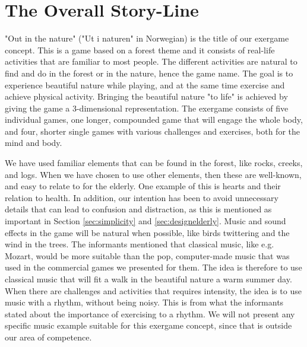\section{The Overall Story-Line}
\label{sec:outinthenature}

"Out in the nature" ("Ut i naturen" in Norwegian) is the title of our exergame concept. This is a game based on a forest theme and it consists of real-life activities that are familiar to most people. The different activities are natural to find and do in the forest or in the nature, hence the game name. The goal is to experience beautiful nature while playing, and at the same time exercise and achieve physical activity. Bringing the beautiful nature "to life" is achieved by giving the game a 3-dimensional representation. The exergame consists of five individual games, one longer, compounded game that will engage the whole body, and four, shorter single games with various challenges and exercises, both for the mind and body.        

We have used familiar elements that can be found in the forest, like rocks, creeks, and logs. When we have chosen to use other elements, then these are well-known, and easy to relate to for the elderly. One example of this is hearts and their relation to health. In addition, our intention has been to avoid unnecessary details that can lead to confusion and distraction, as this is mentioned as important in Section \ref{sec:simplicity} and \ref{sec:designelderly}. Music and sound effects in the game will be natural when possible, like birds twittering and the wind in the trees. The informants mentioned that classical music, like e.g. Mozart, would be more suitable than the pop, computer-made music that was used in the commercial games we presented for them. The idea is therefore to use classical music that will fit a walk in the beautiful nature a warm summer day. When there are challenges and activities that requires intensity, the idea is to use music with a rhythm, without being noisy. This is from what the informants stated about the importance of exercising to a rhythm. We will not present any specific music example suitable for this exergame concept, since that is outside our area of competence. 

